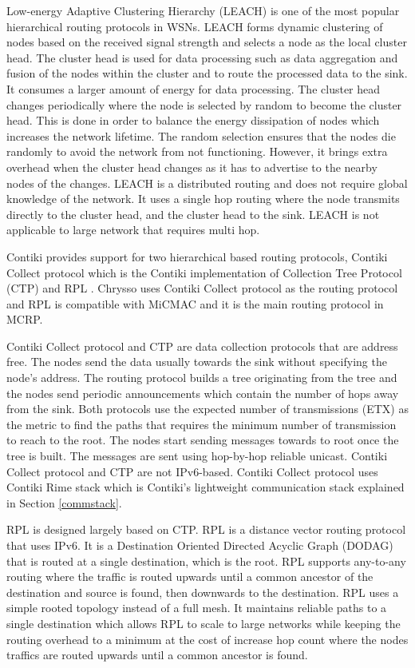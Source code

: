 Low-energy Adaptive Clustering Hierarchy (LEACH) is one of the most popular hierarchical routing protocols in WSNs. LEACH forms dynamic clustering of nodes based on the received signal strength and selects a node as the local cluster head. The cluster head is used for data processing such as data aggregation and fusion of the nodes within the cluster and to route the processed data to the sink. It consumes a larger amount of energy for data processing. The cluster head changes periodically where the node is selected by random to become the cluster head. This is done in order to balance the energy dissipation of nodes which increases the network lifetime. The random selection ensures that the nodes die randomly to avoid the network from not functioning. However, it brings extra overhead when the cluster head changes as it has to advertise to the nearby nodes of the changes. LEACH is a distributed routing and does not require global knowledge of the network. It uses a single hop routing where the node transmits directly to the cluster head, and the cluster head to the sink. LEACH is not applicable to large network that requires multi hop.

Contiki provides support for two hierarchical based routing protocols, Contiki Collect protocol which is the Contiki implementation of Collection Tree Protocol (CTP) \cite{ctp, ctptep} and RPL \cite{winter2012rpl}. Chrysso uses Contiki Collect protocol as the routing protocol and RPL is compatible with MiCMAC and it is the main routing protocol in MCRP.

Contiki Collect protocol and CTP are data collection protocols that are address free. The nodes send the data usually towards the sink without specifying the node's address. The routing protocol builds a tree originating from the tree and the nodes send periodic announcements which contain the number of hops away from the sink. Both protocols use the expected number of transmissions (ETX) as the metric to find the paths that requires the minimum number of transmission to reach to the root. The nodes start sending messages towards to root once the tree is built. The messages are sent using hop-by-hop reliable unicast.
Contiki Collect protocol and CTP are not IPv6-based. Contiki Collect protocol uses Contiki Rime stack which is Contiki's lightweight communication stack explained in Section \ref{commstack}. 

RPL is designed largely based on CTP. RPL is a distance vector routing protocol that uses IPv6. It is a Destination Oriented Directed Acyclic Graph (DODAG) that is routed at a single destination, which is the root. RPL supports any-to-any routing where the traffic is routed upwards until a common ancestor of the destination and source is found, then downwards to the destination. RPL uses a simple rooted topology instead of a full mesh. It maintains reliable paths to a single destination which allows RPL to scale to large networks while keeping the routing overhead to a minimum at the cost of increase hop count where the nodes traffics are routed upwards until a common ancestor is found. 

